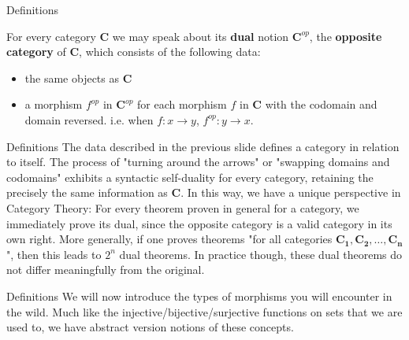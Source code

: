 \documentclass[tikz]{beamer}
\theoremstyle{definition}
\begin{document}
\begin{frame}{Definitions}
    \begin{definition}
        For every category $\mathbf{C}$ we may speak about its \textbf{dual} notion $\mathbf{C}^{op}$, the \textbf{opposite category} of $\mathbf{C}$, which consists of the following data: 
        \begin{itemize}
            \item the same objects as $\mathbf{C}$
            \item a morphism $f^{op}$ in $\mathbf{C}^{op}$ for each morphism $f$ in $\mathbf{C}$ with the codomain and domain reversed. i.e. when $f: x \to y$, $f^{op} : y \to x$.
        \end{itemize}{}
    \end{definition}{}
\end{frame}{}


\begin{frame}{Definitions}
The data described in the previous slide defines a category in relation to itself. The process of "turning around the arrows" or "swapping domains and codomains" exhibits a syntactic self-duality for every category, retaining the precisely the same information as $\mathbf{C}$. In this way, we have a unique perspective in Category Theory: For every theorem proven in general for a category, we immediately prove its dual, since the opposite category is a valid category in its own right. More generally, if one proves theorems "for all categories $\mathbf{C_1}, \mathbf{C_2}, \ldots , \mathbf{C_n}$", then this leads to $2^n$ dual theorems. In practice though, these dual theorems do not differ meaningfully from the original.
    
\end{frame}{}

\begin{frame}{Definitions}
    We will now introduce the types of morphisms you will encounter in the wild. Much like the injective/bijective/surjective functions on sets that we are used to, we have abstract version notions of these concepts.
\end{frame}{}
\end{document}
